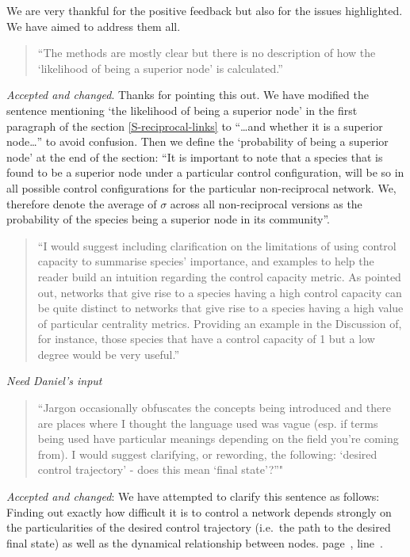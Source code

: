 \documentclass[a4paper]{artikel1}
\newcommand{\lr}[1]{page~\pageref{#1}, line~\lineref{#1}}
\theoremstyle{definition}
\theoremstyle{definition}
\theoremstyle{definition}
\theoremstyle{remark}
\begin{document}
We are very thankful for the positive feedback but also for the issues
highlighted. We have aimed to address them all.

\begin{quote}
``The methods are mostly clear but there is no description of how the
`likelihood of being a superior node' is calculated.''
\end{quote}

\emph{Accepted and changed}. Thanks for pointing this out. We have
modified the sentence mentioning `the likelihood of being a superior
node' in the first paragraph of the section \ref{S-reciprocal-links} to
``\ldots{}and whether it is a superior node\ldots{}'' to avoid
confusion. Then we define the `probability of being a superior node' at
the end of the section: ``It is important to note that a species that is
found to be a superior node under a particular control configuration,
will be so in all possible control configurations for the particular
non-reciprocal network. We, therefore denote the average of \(\sigma\)
across all non-reciprocal versions as the probability of the species
being a superior node in its community''.

\begin{quote}
``I would suggest including clarification on the limitations of using
control capacity to summarise species' importance, and examples to help
the reader build an intuition regarding the control capacity metric. As
pointed out, networks that give rise to a species having a high control
capacity can be quite distinct to networks that give rise to a species
having a high value of particular centrality metrics. Providing an
example in the Discussion of, for instance, those species that have a
control capacity of 1 but a low degree would be very useful.''
\end{quote}

\emph{Need Daniel's input}

\begin{quote}
``Jargon occasionally obfuscates the concepts being introduced and there
are places where I thought the language used was vague (esp. if terms
being used have particular meanings depending on the field you're coming
from). I would suggest clarifying, or rewording, the following: `desired
control trajectory' - does this mean `final state'?''"
\end{quote}

\emph{Accepted and changed}: We have attempted to clarify this sentence
as follows: Finding out exactly how difficult it is to control a network
depends strongly on the particularities of the desired control
trajectory (i.e.~the path to the desired final state) as well as the
dynamical relationship between nodes.
\lr{M-R2-desired-control-trajectory}.
\end{document}
